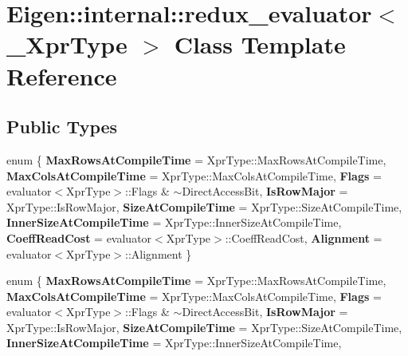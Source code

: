 \hypertarget{class_eigen_1_1internal_1_1redux__evaluator}{}\section{Eigen\+:\+:internal\+:\+:redux\+\_\+evaluator$<$ \+\_\+\+Xpr\+Type $>$ Class Template Reference}
\label{class_eigen_1_1internal_1_1redux__evaluator}
\subsection*{Public Types}
\begin{DoxyCompactItemize}
\item 
\mbox{\label{class_eigen_1_1internal_1_1redux__evaluator_a4bd054041840462c343f6cbf10941fb4}} 
enum \{ \newline
{\bfseries Max\+Rows\+At\+Compile\+Time} = Xpr\+Type\+:\+:Max\+Rows\+At\+Compile\+Time, 
{\bfseries Max\+Cols\+At\+Compile\+Time} = Xpr\+Type\+:\+:Max\+Cols\+At\+Compile\+Time, 
{\bfseries Flags} = evaluator$<$Xpr\+Type$>$\+:\+:Flags \& $\sim$\+Direct\+Access\+Bit, 
{\bfseries Is\+Row\+Major} = Xpr\+Type\+:\+:Is\+Row\+Major, 
\newline
{\bfseries Size\+At\+Compile\+Time} = Xpr\+Type\+:\+:Size\+At\+Compile\+Time, 
{\bfseries Inner\+Size\+At\+Compile\+Time} = Xpr\+Type\+:\+:Inner\+Size\+At\+Compile\+Time, 
{\bfseries Coeff\+Read\+Cost} = evaluator$<$Xpr\+Type$>$\+:\+:Coeff\+Read\+Cost, 
{\bfseries Alignment} = evaluator$<$Xpr\+Type$>$\+:\+:Alignment
 \}
\item 
\mbox{\label{class_eigen_1_1internal_1_1redux__evaluator_a5281024da4be5846fc4adbba16535860}} 
enum \{ \newline
{\bfseries Max\+Rows\+At\+Compile\+Time} = Xpr\+Type\+:\+:Max\+Rows\+At\+Compile\+Time, 
{\bfseries Max\+Cols\+At\+Compile\+Time} = Xpr\+Type\+:\+:Max\+Cols\+At\+Compile\+Time, 
{\bfseries Flags} = evaluator$<$Xpr\+Type$>$\+:\+:Flags \& $\sim$\+Direct\+Access\+Bit, 
{\bfseries Is\+Row\+Major} = Xpr\+Type\+:\+:Is\+Row\+Major, 
\newline
{\bfseries Size\+At\+Compile\+Time} = Xpr\+Type\+:\+:Size\+At\+Compile\+Time, 
{\bfseries Inner\+Size\+At\+Compile\+Time} = Xpr\+Type\+:\+:Inner\+Size\+At\+Compile\+Time, 

\end{DoxyCompactItemize}
